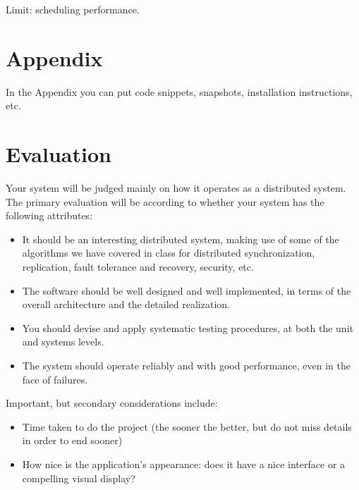 \documentclass[a4paper, oneside]{memoir}
\begin{document}
Limit: scheduling performance.


\appendix

\chapter{Appendix}

In the Appendix you can put code snippets, snapshots, installation instructions, etc.


\chapter*{Evaluation}
Your system will be judged mainly on how it operates as a distributed system. The primary evaluation will be according to whether your system has the following attributes:
\begin{itemize}
\item  It should be an interesting distributed system, making use of some of the algorithms we have covered in class for distributed synchronization, replication, fault tolerance and recovery, security, etc.
\item The software should be well designed and well implemented, in terms of the overall architecture and the detailed realization.
\item You should devise and apply systematic testing procedures, at both the unit and systems levels.
\item The system should operate reliably and with good performance, even in the face of failures.
\end{itemize}
Important, but secondary considerations include:
\begin{itemize}
\item Time taken to do the project (the sooner the better, but do not miss details in order to end sooner)
\item  How nice is the application's appearance: does it have a nice interface or a compelling visual display?
\end{itemize}
\end{document}
